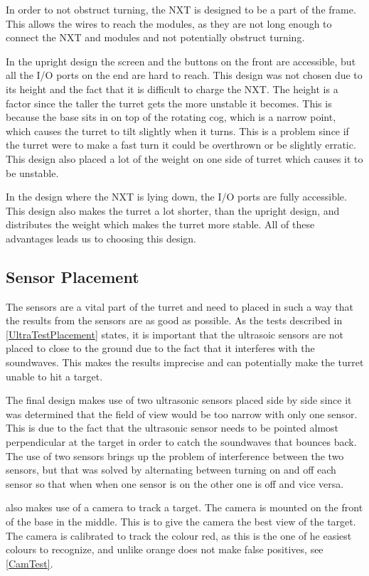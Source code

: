 In order to not obstruct turning, the NXT is designed to be a part of the
frame. This allows the wires to reach the modules, as they are not long
enough to connect the NXT and modules and not potentially obstruct
turning.\nl

In the upright design the screen and the buttons on the front
are accessible, but all the I/O ports on the end are hard to reach. This
design was not chosen due to its height and the fact that it is difficult to
charge the NXT. The height is a factor since the taller the turret gets the
more unstable it becomes. This is because the base sits in on top of the
rotating cog, which is a narrow point, which causes the turret to tilt
slightly when it turns. This is a problem since if the turret were to make a
fast turn it could be overthrown or be slightly erratic. This design also
placed a lot of the weight on one side of turret which causes it to be
unstable.\nl

In the design where the NXT is lying down, the I/O ports are fully accessible.
This design also makes the turret a lot shorter, than the upright design, and
distributes the weight which makes the turret more stable. All of these
advantages leads us to choosing this design.

\subsection{Sensor Placement}
The sensors are a vital part of the turret and need to placed in such a way that
the results from the sensors are as good as possible. As the tests described in
\autoref{UltraTestPlacement} states, it is important that the ultrasoic sensors
are not placed to close to the ground due to the fact that it interferes with
the soundwaves. This makes the results imprecise and can potentially make the
turret unable to hit a target.\nl

The final design makes use of two ultrasonic sensors placed side by side since
it was determined that the field of view would be too narrow with only one
sensor. This is due to the fact that the ultrasonic sensor needs to be pointed
almost perpendicular at the target in order to catch the soundwaves that bounces
back. The use of two sensors brings up the problem of interference between the
two sensors, but that was solved by alternating between turning on and off each
sensor so that when when one sensor is on the other one is off and vice
versa.\nl

\name also makes use of a camera to track a target. The camera is mounted on
the front of the base in the middle. This is to give the camera the best
view of the target. The camera is calibrated to track the colour red, as this is
the one of he easiest colours to recognize, and unlike orange does not make
false positives, see \autoref{CamTest}.

